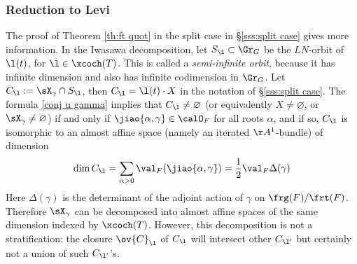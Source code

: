 \subsubsection{Reduction to Levi} The proof of Theorem \ref{th:ft quot} in the split case in \S\ref{sss:split case} gives more information. In the Iwasawa decomposition, let $S_{\l}\subset \Gr_{G}$ be the $LN$-orbit of $\l(t)$, for $\l\in\xcoch(T)$. This is called a {\em semi-infinite orbit}, because it has infinite dimension and also has infinite codimension in $\Gr_{G}$.  Let $C_{\l}:=\sX_{\gamma}\cap S_{\l}$, then $C_{\l}=\l(t)\cdot X$ in the notation of \S\ref{sss:split case}. The formula \eqref{conj u gamma} implies that $C_{\l}\neq\varnothing$ (or equivalently $X\neq\varnothing$, or $\sX_{\gamma}\neq\varnothing$) if and only if $\jiao{\alpha,\gamma}\in\calO_{F}$ for all roots $\alpha$, and if so, $C_{\l}$ is isomorphic to an almost affine space (namely an iterated $\AA^{1}$-bundle) of dimension
\begin{equation*}
\dim C_{\l}=\sum_{\alpha>0}\val_{F}(\jiao{\alpha,\gamma})=\frac{1}{2}\val_{F}\Delta(\gamma)
\end{equation*}
Here $\Delta(\gamma)$ is the determinant of the adjoint action of $\gamma$ on $\frg(F)/\frt(F)$. Therefore $\sX_{\gamma}$ can be decomposed into almost affine spaces of the same dimension indexed by $\xcoch(T)$. However, this decomposition is not a stratification: the closure $\ov{C}_{\l}$ of $C_{\l}$ will intersect other $C_{\l'}$ but certainly not a union of such $C_{\l'}$'s. 

